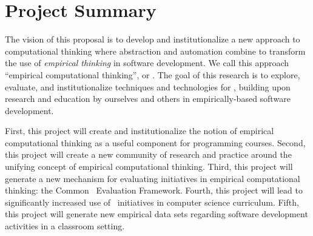 
\section*{Project Summary}
\renewcommand{\thepage} {A--\arabic{page}}






  The vision of this proposal is to develop and
institutionalize a new approach to computational thinking where abstraction
and automation combine to transform the use of {\em empirical thinking} in
software development.  We call this approach ``empirical computational
thinking'', or \eCT.  The goal of this research is to explore, evaluate, and institutionalize
techniques and technologies for \eCT, building upon research and education
by ourselves and others in empirically-based software development.

\medskip

  First, this project will create and
institutionalize the notion of empirical computational thinking as a useful
component for programming courses. Second, this project will create a new
community of research and practice around the unifying concept of empirical
computational thinking.  Third, this project will generate a new mechanism
for evaluating initiatives in empirical computational thinking: the Common
\eCT\ Evaluation Framework. Fourth, this project will lead to significantly
increased use of \eCT\ initiatives in computer science curriculum. Fifth,
this project will generate new empirical data sets regarding software
development activities in a classroom setting.


